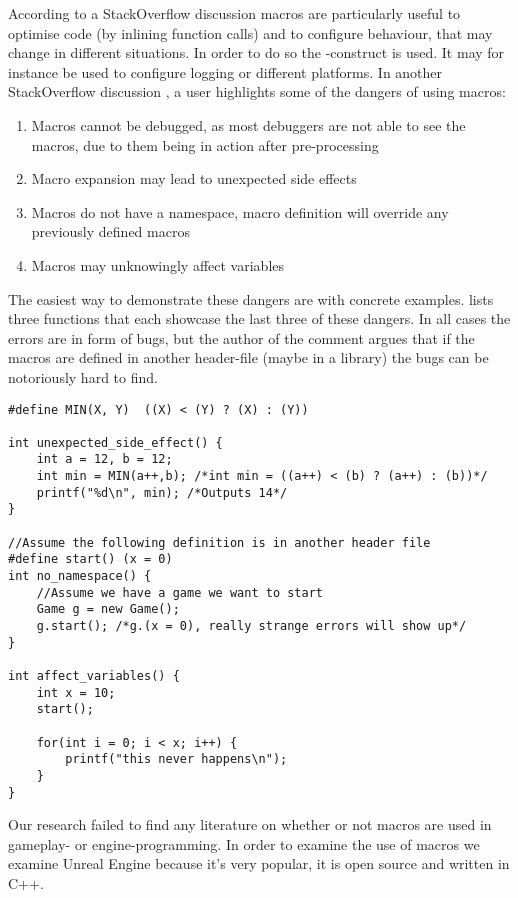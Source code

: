 According to a StackOverflow discussion \cite{so:c:macros} macros are particularly useful to optimise code (by inlining function calls) and to configure behaviour, that may change in different situations. In order to do so the -construct is used. It may for instance be used to configure logging or different platforms. In another StackOverflow discussion \cite{so:c:macros:evil}, a user highlights some of the dangers of using macros:
\begin{enumerate}
    \item Macros cannot be debugged, as most debuggers are not able to see the macros, due to them being in action after pre-processing
    \item Macro expansion may lead to unexpected side effects
    \item Macros do not have a namespace, macro definition will override any previously defined macros
    \item Macros may unknowingly affect variables
\end{enumerate}
The easiest way to demonstrate these dangers are with concrete examples.  lists three functions that each showcase the last three of these dangers. In all cases the errors are in form of bugs, but the author of the comment argues that if the macros are defined in another header-file (maybe in a library) the bugs can be notoriously hard to find.
\begin{lstlisting}[label={lst:c:macros:dangers}, caption={Dangers of using macros as argued by \cite{so:c:macros:evil}}, style={C}]
#define MIN(X, Y)  ((X) < (Y) ? (X) : (Y))

int unexpected_side_effect() {
    int a = 12, b = 12;
    int min = MIN(a++,b); /*int min = ((a++) < (b) ? (a++) : (b))*/
    printf("%d\n", min); /*Outputs 14*/
}

//Assume the following definition is in another header file
#define start() (x = 0)
int no_namespace() {
    //Assume we have a game we want to start
    Game g = new Game();
    g.start(); /*g.(x = 0), really strange errors will show up*/
}

int affect_variables() {
    int x = 10;
    start();
    
    for(int i = 0; i < x; i++) {
        printf("this never happens\n");
    }
}
\end{lstlisting}

Our research failed to find any literature on whether or not macros are used in gameplay- or engine-programming. In order to examine the use of macros we examine Unreal Engine because it's very popular, it is open source and written in C++.

